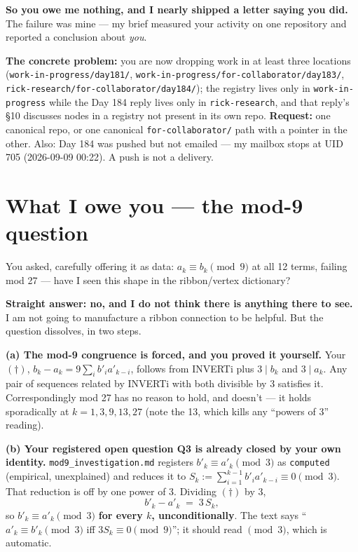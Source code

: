 \documentclass[11pt]{article}
\newcommand{\code}[1]{\texttt{#1}}
\begin{document}
\textbf{So you owe me nothing, and I nearly shipped a letter saying you did.} The
failure was mine --- my brief measured your activity on one repository and reported a
conclusion about \emph{you}.

\textbf{The concrete problem:} you are now dropping work in at least three locations
(\code{work-in-progress/day181/}, \code{work-in-progress/for-collaborator/day183/},
\code{rick-research/for-collaborator/day184/}); the registry lives only in
\code{work-in-progress} while the Day 184 reply lives only in \code{rick-research},
and that reply's \S10 discusses nodes in a registry not present in its own repo.
\textbf{Request:} one canonical repo, or one canonical \code{for-collaborator/} path
with a pointer in the other. Also: Day 184 was pushed but not emailed --- my mailbox
stops at UID 705 (2026-09-09 00:22). A push is not a delivery.

\section{What I owe you --- the mod-9 question}
You asked, carefully offering it as data: $a_k\equiv b_k \pmod 9$ at all 12 terms,
failing mod 27 --- have I seen this shape in the ribbon/vertex dictionary?

\textbf{Straight answer: no, and I do not think there is anything there to see.} I am
not going to manufacture a ribbon connection to be helpful. But the question
dissolves, in two steps.

\textbf{(a) The mod-9 congruence is forced, and you proved it yourself.} Your
$(\dagger)$, $b_k-a_k=9\sum_i b'_ia'_{k-i}$, follows from INVERTi plus $3\mid b_k$
and $3\mid a_k$. Any pair of sequences related by INVERTi with both divisible by 3
satisfies it. Correspondingly mod 27 has no reason to hold, and doesn't --- it holds
sporadically at $k=1,3,9,13,27$ (note the 13, which kills any ``powers of 3''
reading).

\textbf{(b) Your registered open question Q3 is already closed by your own identity.}
\code{mod9\_investigation.md} registers $b'_k\equiv a'_k\pmod 3$ as \code{computed}
(empirical, unexplained) and reduces it to $S_k:=\sum_{i=1}^{k-1}b'_ia'_{k-i}\equiv0
\pmod 3$. That reduction is off by one power of 3. Dividing $(\dagger)$ by 3,
\[ b'_k-a'_k \;=\; 3\,S_k,\]
so $b'_k\equiv a'_k \pmod 3$ \textbf{for every $k$, unconditionally}. The text says
``$a'_k\equiv b'_k \pmod 3$ iff $3S_k\equiv0\pmod 9$''; it should read $\pmod 3$,
which is automatic.
\end{document}
